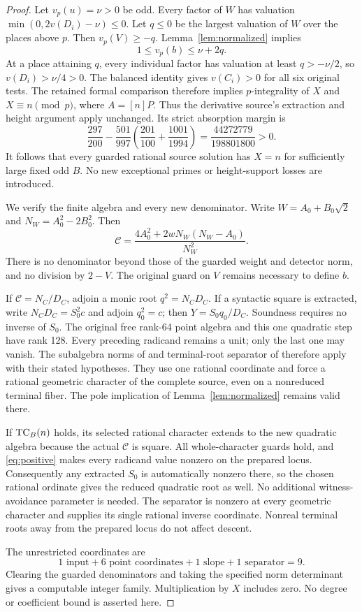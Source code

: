 \documentclass[11pt,a4paper]{article}
\begin{document}
\begin{proof}
Let $v_p(u)=\nu>0$ be odd. Every factor of $W$ has valuation
$\min(0,2v(D_i)-\nu)\le0$. Let $q\le0$ be the largest
valuation of $W$ over the places above $p$. Then $v_p(V)\ge-q$.
Lemma~\ref{lem:normalized} implies
\[
                         1\le v_p(b)\le\nu+2q.
\]
At a place attaining $q$, every individual factor has valuation
at least $q> -\nu/2$, so $v(D_i)>\nu/4>0$. The balanced
identity gives $v(C_i)>0$ for all six original tests.
The retained formal comparison therefore implies $p$-integrality
of $X$ and $X\equiv n\pmod p$, where $A=[n]P$.
Thus the derivative source's extraction and height argument apply
unchanged. Its strict absorption margin is
\[
 \frac{297}{200}
 -\frac{501}{997}\left(\frac{201}{100}+\frac{1001}{1994}\right)
                 =\frac{44272779}{198801800}>0.
\]
It follows that every guarded rational source solution has $X=n$
for sufficiently large fixed odd $B$. No new exceptional primes or
height-support losses are introduced.

We verify the finite algebra and every new denominator.
Write $W=A_0+B_0\sqrt2$ and $N_W=A_0^2-2B_0^2$. Then
\begin{equation}\label{eq:cleared}
 \mathcal C=
           \frac{4A_0^2+2wN_W(N_W-A_0)}{N_W^2}.
\end{equation}
There is no denominator beyond those of the guarded weight and
detector norm, and no division by $2-V$. The original guard on
$V$ remains necessary to define $b$.

If $\mathcal C=N_C/D_C$, adjoin a monic root $q^2=N_CD_C$.
If a syntactic square is extracted, write $N_CD_C=S_0^2c$ and
adjoin $q_0^2=c$; then $Y=S_0q_0/D_C$. Soundness requires
no inverse of $S_0$. The original free rank-64 point algebra and
this one quadratic step have rank 128. Every preceding radicand
remains a unit; only the last one may vanish. The subalgebra norms
of \cite{Subalgebra} and terminal-root separator of \cite{Terminal}
therefore apply with their stated hypotheses. They use one rational
coordinate and force a rational geometric character of the complete
source, even on a nonreduced terminal fiber. The pole implication
of Lemma~\ref{lem:normalized} remains valid there.

If $\operatorname{TC}_B(n)$ holds, its selected rational character extends to
the new quadratic algebra because the actual $\mathcal C$ is square.
All whole-character guards hold, and \eqref{eq:positive} makes
every radicand value nonzero on the prepared locus. Consequently
any extracted $S_0$ is automatically nonzero there, so the chosen
rational ordinate gives the reduced quadratic root as well. No
additional witness-avoidance parameter is needed. The separator is
nonzero at every geometric character and supplies its single rational
inverse coordinate. Nonreal terminal roots away from the prepared
locus do not affect descent.

The unrestricted coordinates are
\[
 1\text{ input}+6\text{ point coordinates}+1\text{ slope}
                         +1\text{ separator}=9.
\]
Clearing the guarded denominators and taking the specified norm
determinant gives a computable integer family. Multiplication by $X$
includes zero. No degree or coefficient bound is asserted here.
\end{proof}
\end{document}
